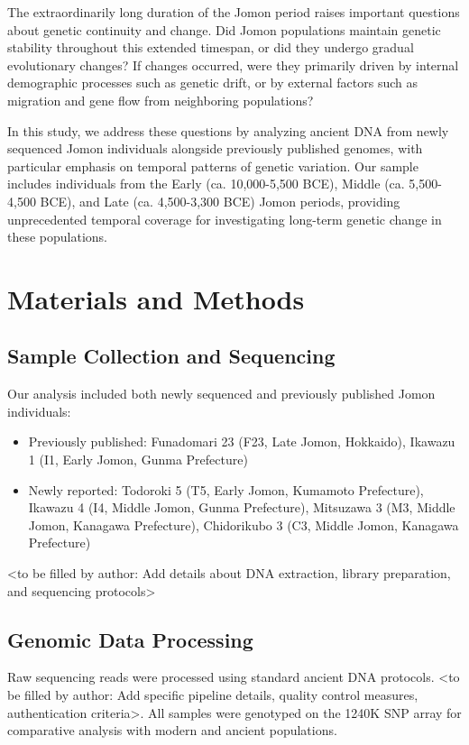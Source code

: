 \documentclass[12pt]{article}
\begin{document}
The extraordinarily long duration of the Jomon period raises important questions about genetic continuity and change. Did Jomon populations maintain genetic stability throughout this extended timespan, or did they undergo gradual evolutionary changes? If changes occurred, were they primarily driven by internal demographic processes such as genetic drift, or by external factors such as migration and gene flow from neighboring populations?

In this study, we address these questions by analyzing ancient DNA from newly sequenced Jomon individuals alongside previously published genomes, with particular emphasis on temporal patterns of genetic variation. Our sample includes individuals from the Early (ca. 10,000-5,500 BCE), Middle (ca. 5,500-4,500 BCE), and Late (ca. 4,500-3,300 BCE) Jomon periods, providing unprecedented temporal coverage for investigating long-term genetic change in these populations.

\section{Materials and Methods}

\subsection{Sample Collection and Sequencing}

Our analysis included both newly sequenced and previously published Jomon individuals:
\begin{itemize}
\item Previously published: Funadomari 23 (F23, Late Jomon, Hokkaido), Ikawazu 1 (I1, Early Jomon, Gunma Prefecture)
\item Newly reported: Todoroki 5 (T5, Early Jomon, Kumamoto Prefecture), Ikawazu 4 (I4, Middle Jomon, Gunma Prefecture), Mitsuzawa 3 (M3, Middle Jomon, Kanagawa Prefecture), Chidorikubo 3 (C3, Middle Jomon, Kanagawa Prefecture)
\end{itemize}

<to be filled by author: Add details about DNA extraction, library preparation, and sequencing protocols>

\subsection{Genomic Data Processing}

Raw sequencing reads were processed using standard ancient DNA protocols. <to be filled by author: Add specific pipeline details, quality control measures, authentication criteria>. All samples were genotyped on the 1240K SNP array for comparative analysis with modern and ancient populations.
\end{document}
